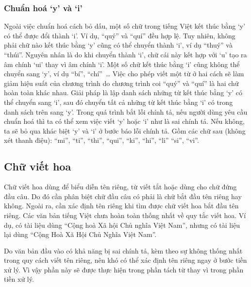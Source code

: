 \documentclass[a4paper,oneside,14pt]{extbook} %
\begin{document}
\subsubsection{Chuẩn hoá `y' và `i'}

Ngoài việc chuẩn hoá cách bỏ dấu, một số chữ trong tiếng Việt kết thúc
bằng `y' có thể được đổi thành `i'. Ví dụ, ``quý'' và ``quí'' đều hợp
lệ. Tuy nhiên, không phải chữ nào kết thúc bằng `y' cũng có thể chuyển
thành `i', ví dụ ``thuý'' và ``thúi''. Nguyên nhân là do khi
chuyển thành `i', chữ cái này kết hợp với `u' tạo ra âm chính `ui'
thay vì âm chính `i'. Một số chữ kết thúc bằng `i' cũng không thể
chuyển sang `y', ví dụ ``bí'', ``chí''~\ldots{} Việc cho phép viết
một từ ở hai cách sẽ làm giảm hiệu suất của chương trình do chương
trình coi ``quý'' và ``quí'' là hai chữ hoàn toàn khác nhau. Giải pháp
là lập danh sách những từ kết thúc bằng `y' có thể chuyển sang `i',
sau đó chuyển tất cả những từ kết thúc bằng `i' có trong danh sách
trên sang `y'. Trong quá trình bắt lỗi chính tả, nếu người dùng yêu
cầu chuẩn hoá thì ta có thể xem việc viết `y' hoặc `i' như là sai
chính tả. Nếu không, ta sẽ bỏ qua khác biệt `y' và `i' ở bước báo lỗi
chính tả. Gồm các chữ sau (không xét thanh điệu): ``mi'', ``ti'',
``thi'', ``qui'', ``ki'', ``hi'', ``li'' ``si'', ``vi''.

\subsection{Chữ viết hoa}

Chữ viết hoa dùng để biểu diễn tên riêng, từ viết tắt hoặc dùng cho
chữ đứng đầu câu. Do đó cần phân biệt chữ đầu câu có 
phải là chữ bắt đầu tên riêng hay không. Ngoài ra, cần xác định tên riêng khi
tìm được chữ viết hoa bắt đầu tên riêng. Các văn bản tiếng Việt chưa
hoàn toàn thống nhất về quy tắc viết hoa. Ví dụ, có tài liệu dùng
``Cộng hoà Xã hội Chủ nghĩa Việt Nam'', nhưng có tài liệu lại dùng
``Cộng Hoà Xã Hội Chủ Nghĩa Việt Nam''.

Do văn bản đầu vào có khả năng bị sai chính tả, kèm theo sự không
thống nhất trong quy cách viết tên riêng, nên khó có thể xác định
tên riêng ngay ở bước tiền xử lý. Vì vậy phần này sẽ được thực hiện trong
phần tách từ thay vì trong phần tiền xử lý.

\end{document}
